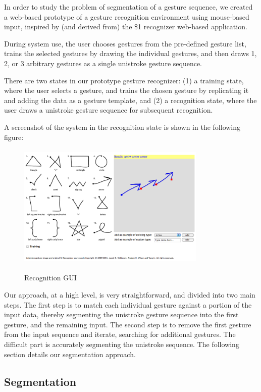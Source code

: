 \documentclass[twoside]{article}
\begin{document}
\begin{multicols}{2}
In order to study the problem of segmentation of a gesture sequence, we created
a web-based prototype of a gesture recognition environment using mouse-based
input, inspired by (and derived from) the \$1 recognizer web-based
application\cite{wobbrock2007gestures}.

During system use, the user chooses gestures from the pre-defined gesture list, trains the selected gestures by drawing
the individual gestures, and then draws 1, 2, or 3 arbitrary gestures as
a single unistroke gesture sequence.

There are two states in our prototype gesture recognizer: (1) a training state,
where the user selects a gesture, and trains the chosen gesture by replicating
it and adding the data as a gesture template, and (2) a recognition state, where
the user draws a unistroke gesture sequence for subsequent recognition.

A screenshot of the system in the recognition state is shown in the following figure:

\begin{figure}[H]
	\centering
	\includegraphics[height=6cm, width=9cm]{Images/GUI.png}
	\label{fig1}
	\caption{Recognition GUI}
\end{figure}
  
Our approach, at a high level, is very straightforward, and divided into two
main steps. The first step is to match each individual gesture against a portion
of the input data, thereby segmenting the unistroke gesture sequence into the
first gesture, and the remaining input. The second step is to remove the first
gesture from the input sequence and iterate, searching for additional gestures.
The difficult part is accurately segmenting the unistroke sequence. The following
section details our segmentation approach.

\subsection*{Segmentation}


\end{multicols}
\end{document}
